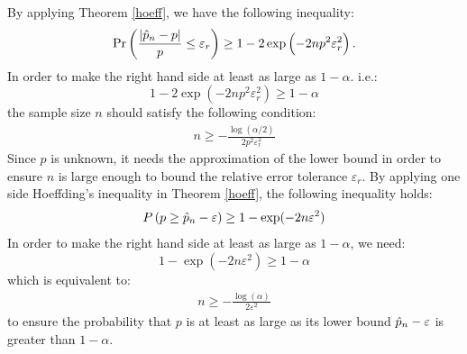 \documentclass{iitthesis}
\begin{document}
By applying Theorem \ref{hoeff}, we have the following inequality:
\begin{align*}
\Pr\left(\frac{|\hat{p}_n-p|}{p} \leq \varepsilon_r\right) \geq 1-2\exp\left(-2np^2\varepsilon_r^2\right).
\end{align*}
In order to make the right hand side at least as large as $1-\alpha$. i.e.:
$$1-2\exp\left(-2np^2\varepsilon_r^2\right) \geq 1-\alpha$$
the sample size $n$ should satisfy the following condition: 
\begin{align*}
n \geq -\frac{\log (\alpha/2)}{2 p^2 \varepsilon_r^2}
\end{align*}
Since $p$ is unknown, it needs the approximation of the lower bound in order to ensure $n$ is large enough to bound the relative error tolerance $\varepsilon_r$. By applying one side Hoeffding's inequality in Theorem \ref{hoeff}, the following inequality holds:
\begin{align}\label{onesidehoeffn}
P\left(p \geq \hat{p}_n-\varepsilon \right) \geq 1- \exp(-2n\varepsilon^2)
\end{align}
In order to make the right hand side at least as large as $1-\alpha$, we need:
$$1- \exp(-2n\varepsilon^2) \geq 1-\alpha$$
which is equivalent to: 
\begin{align*}
n \geq -\frac{\log(\alpha)} {2\varepsilon^2 }
 \end{align*}
to ensure the probability that $p$  is at least as large as its lower bound $\hat{p}_n-\varepsilon$ is greater than $1-\alpha$.
\end{document}
